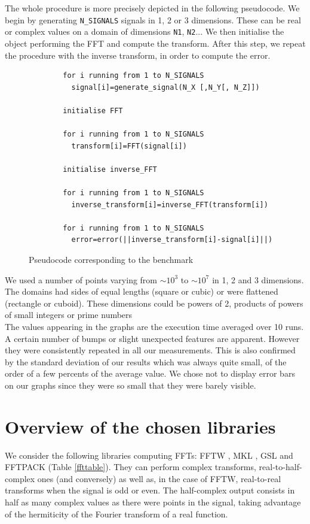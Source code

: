\documentclass[12pt, a4paper]{article}
\begin{document}
The whole procedure is more precisely depicted in the following pseudocode. We begin by generating \texttt{N\_SIGNALS} signals in 1, 2 or 3 dimensions. These can be real or complex values on a domain of dimensions \texttt{N1}, \texttt{N2}... We then initialise the object performing the FFT and compute the transform. After this step, we repeat the procedure with the inverse transform, in order to compute the error.
\begin{figure}[H]
\captionsetup{width=0.8\linewidth}
\centering
  
\begin{verbatim}
        for i running from 1 to N_SIGNALS
          signal[i]=generate_signal(N_X [,N_Y[, N_Z]])

        initialise FFT

        for i running from 1 to N_SIGNALS
          transform[i]=FFT(signal[i])

        initialise inverse_FFT

        for i running from 1 to N_SIGNALS
          inverse_transform[i]=inverse_FFT(transform[i])

        for i running from 1 to N_SIGNALS
          error=error(||inverse_transform[i]-signal[i]||)
\end{verbatim}
\caption{Pseudocode corresponding to the benchmark}
\label{PSEUDOCODE}
\end{figure}

We used a number of points varying from $\sim 10^3$ to $\sim 10^7$ in 1, 2 and 3 dimensions. The domains had sides of equal lengths (square or cubic) or were flattened (rectangle or cuboid). These dimensions could be powers of 2, products of powers of small integers or prime numbers\\

The values appearing in the graphs are the execution time averaged over 10 runs. A certain number of bumps or slight unexpected features are apparent. However they were consistently repeated in all our measurements. This is also confirmed by the standard deviation of our results which was always quite small, of the order of a few percents of the average value. We chose not to display error bars on our graphs since they were so small that they were barely visible. 

\section{Overview of the chosen libraries}
We consider the following libraries computing FFTs: FFTW \cite{fftw}, MKL \cite{mkl}, GSL \cite{gsl} and FFTPACK \cite{fftpack} (Table \ref{ffttable}). They can perform complex transforms, real-to-half-complex ones (and conversely) as well as, in the case of FFTW, real-to-real transforms when the signal is odd or even. The half-complex output consists in half as many complex values as there were points in the signal, taking advantage of the hermiticity of the Fourier transform of a real function.\\
\end{document}
